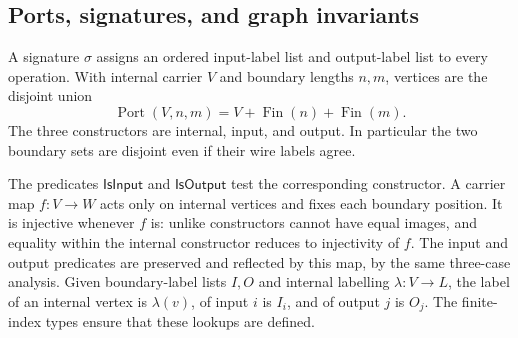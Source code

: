 \subsection{Ports, signatures, and graph invariants}
\begin{definition}\label{term:ports}
A signature $\sigma$ assigns an ordered input-label list and output-label list
to every operation. With internal carrier $V$ and boundary lengths $n,m$, vertices
are the disjoint union
\[
 \operatorname{Port}(V,n,m)=V+\operatorname{Fin}(n)+\operatorname{Fin}(m).
\]
The three constructors are internal, input, and output. In particular the two
boundary sets are disjoint even if their wire labels agree.
\end{definition}
The predicates $\mathsf{IsInput}$ and $\mathsf{IsOutput}$ test the corresponding
constructor. A carrier map $f:V\to W$ acts only on internal vertices and fixes
each boundary position. It is injective whenever $f$ is: unlike constructors
cannot have equal images, and equality within the internal constructor reduces
to injectivity of $f$. The input and output predicates are preserved and reflected
by this map, by the same three-case analysis.
Given boundary-label lists $I,O$ and internal labelling $\lambda:V\to L$, the label
of an internal vertex is $\lambda(v)$, of input $i$ is $I_i$, and of output $j$
is $O_j$. The finite-index types ensure that these lookups are defined.

